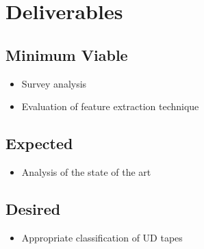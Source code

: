 \documentclass[rnd]{mas_proposal}
\begin{document}
\section{Deliverables}
\subsection{Minimum Viable}
\begin{itemize}
    \item Survey analysis
    \item Evaluation of feature extraction technique
\end{itemize}

\subsection{Expected}
\begin{itemize}
    \item Analysis of the state of the art
\end{itemize}

\subsection{Desired}
\begin{itemize}
    \item Appropriate classification of UD tapes
\end{itemize}


\nocite{*}

\end{document}
